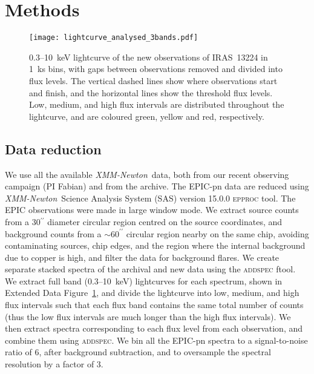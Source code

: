\documentclass[10pt, a4paper]{article}
\newcommand{\xmm}{{\it XMM-Newton}}
\begin{document}
\setcounter{figure}{0}  

\captionsetup[figure]{name=Extended Data Figure}
\captionsetup[table]{name=Extended Data Table}

\pagebreak

\section*{Methods}
\begin{figure}[h]
\texttt{[image: lightcurve\_analysed\_3bands.pdf]}
\caption{0.3--10~keV lightcurve of the new observations of IRAS~13224 in 1~ks bins, with gaps between observations removed and divided into flux levels. The vertical dashed lines show where observations start and finish, and the horizontal lines show the threshold flux levels. Low, medium, and high flux intervals are distributed throughout the lightcurve, and are coloured green, yellow and red, respectively.}
\label{fig_lightcurve}
\end{figure}
\subsection*{Data reduction}

We use all the available \xmm\ data, both from our recent observing campaign (PI Fabian) and from the archive. The EPIC-pn data are reduced using \xmm\ Science Analysis System (SAS) version 15.0.0 \textsc{epproc} tool. The EPIC observations were made in large window mode. We extract source counts from a 30$^{\prime\prime}$ diameter circular region centred on the source coordinates, and background counts from a $\sim60^{\prime\prime}$ circular region nearby on the same chip, avoiding contaminating sources, chip edges, and the region where the internal background due to copper is high,  and filter the data for background flares. We create separate stacked spectra of the archival and new data using the \textsc{addspec} ftool. We extract full band (0.3--10~keV) lightcurves for each spectrum, shown in Extended Data Figure~\ref{fig_lightcurve}, and divide the lightcurve into low, medium, and high flux intervals such that each flux band contains the same total number of counts (thus the low flux intervals are much longer than the high flux intervals). We then extract spectra corresponding to each flux level from each observation, and combine them using \textsc{addspec}. We bin all the EPIC-pn spectra to a signal-to-noise ratio of 6, after background subtraction, and to oversample the spectral resolution by a factor of 3.
\end{document}
